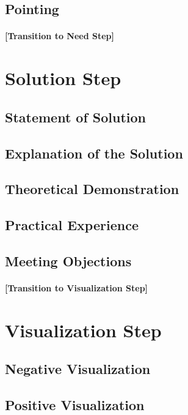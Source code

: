 \documentclass{article}
\begin{document}
    \subsection{Pointing}

  \paragraph{[Transition to Need Step]}

  \section{Solution Step}
    \subsection{Statement of Solution}
    \subsection{Explanation of the Solution}
    \subsection{Theoretical Demonstration}
    \subsection{Practical Experience}
    \subsection{Meeting Objections}

  \paragraph{[Transition to Visualization Step]}

  \section{Visualization Step}
    \subsection{Negative Visualization}
    \subsection{Positive Visualization}
\end{document}
